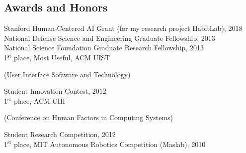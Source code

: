 \documentclass[margin,line]{resume}
\begin{document}
\begin{resume}


\pagebreak





\section{\mysidestyle Awards and Honors}

Stanford Human-Centered AI Grant (for my research project HabitLab), 2018\\ %
National Defense Science and Engineering Graduate Fellowship, 2013\\ %
National Science Foundation Graduate Research Fellowship, 2013\\ %
1$^{\textrm{st}}$ place, Most Useful, ACM UIST \begin{small}(User Interface Software and Technology)\end{small} Student Innovation Contest, 2012\\
1$^{\textrm{st}}$ place, ACM CHI \begin{small}(Conference on Human Factors in Computing Systems)\end{small} Student Research Competition, 2012\\
1$^{\textrm{st}}$ place, MIT Autonomous Robotics Competition (Maslab), 2010


\end{resume}
\end{document}
